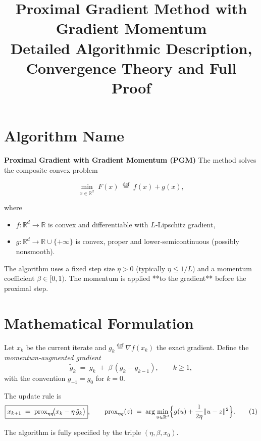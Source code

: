 \documentclass[11pt]{article}
\begin{document}
\title{Proximal Gradient Method with Gradient Momentum \\ Detailed Algorithmic Description, Convergence Theory and Full Proof}
\author{}
\date{}
\maketitle

\section*{Algorithm Name}
\textbf{Proximal Gradient with Gradient Momentum (PGM)}  
The method solves the composite convex problem  

\[
\min_{x\in\mathbb{R}^{d}} \; F(x)\;\stackrel{\mathrm{def}}{=}\; f(x)+g(x),
\]

where  

\begin{itemize}
  \item $f:\mathbb{R}^{d}\!\rightarrow\!\mathbb{R}$ is convex and differentiable with $L$‑Lipschitz gradient,
  \item $g:\mathbb{R}^{d}\!\rightarrow\!\mathbb{R}\cup\{+\infty\}$ is convex, proper and lower‑semicontinuous (possibly nonsmooth).
\end{itemize}

The algorithm uses a fixed step size $\eta>0$ (typically $\eta\le 1/L$) and a momentum coefficient
$\beta\in[0,1)$.  The momentum is applied **to the gradient** before the proximal step.

\section*{Mathematical Formulation}
Let $x_{k}$ be the current iterate and $g_{k}\stackrel{\mathrm{def}}{=}\nabla f(x_{k})$ the exact gradient.
Define the \emph{momentum‑augmented gradient}
\[
\tilde g_{k}\;=\;g_{k}\;+\;\beta\,(g_{k}-g_{k-1}),\qquad k\ge 1,
\]
with the convention $g_{-1}=g_{0}$ for $k=0$.

The update rule is
\[
\boxed{%
x_{k+1}
\;=\;
\operatorname{prox}_{\eta g}\!\bigl(x_{k}-\eta\,\tilde g_{k}\bigr)},
\qquad 
\operatorname{prox}_{\eta g}(z)
\;=\;
\arg\min_{u\in\mathbb{R}^{d}}\Bigl\{ g(u)+\frac{1}{2\eta}\|u-z\|^{2}\Bigr\}.
\tag{1}
\]

The algorithm is fully specified by the triple $(\eta,\beta,x_{0})$.
\end{document}
